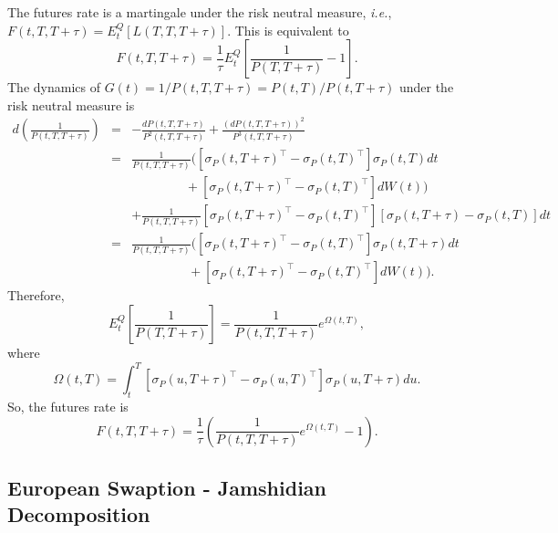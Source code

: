 \documentclass[12pt]{article}
\begin{document}
    The futures rate is a martingale under the risk neutral measure, {\it i.e.}, $F(t,T,T+\tau)=E_t^Q[L(T,T,T+\tau)]$.
    This is equivalent to
    \begin{equation}
      F(t,T,T+\tau)=\frac{1}{\tau}E_t^Q\left[\frac{1}{P(T,T+\tau)}-1\right].
    \end{equation}
    The dynamics of $G(t)=1/P(t,T,T+\tau)=P(t,T)/P(t,T+\tau)$ under the risk neutral measure is
    \begin{eqnarray}
      d\left(\frac{1}{P(t,T,T+\tau)}\right)&=&-\frac{dP(t,T,T+\tau)}{P^2(t,T,T+\tau)}+\frac{\left(dP(t,T,T+\tau)\right)^2}{P^3(t,T,T+\tau)}\nonumber\\
                &=&\frac{1}{P(t,T,T+\tau)}\Big(\left[\sigma_P(t,T+\tau)^{\top}-\sigma_P(t,T)^{\top}\right]\sigma_P(t,T)dt\nonumber\\
                && \ \ \ \ \ \ \ \ \ \ \ \ \ \ \  \ \ \ \ +\left[\sigma_P(t,T+\tau)^{\top}-\sigma_P(t,T)^{\top}\right]dW(t)\Big)\nonumber\\
                && + \frac{1}{P(t,T,T+\tau)}\left[\sigma_P(t,T+\tau)^{\top}-\sigma_P(t,T)^{\top}\right]\left[\sigma_P(t,T+\tau)-\sigma_P(t,T)\right]dt\nonumber\\
                &=&\frac{1}{P(t,T,T+\tau)}\Big(\left[\sigma_P(t,T+\tau)^{\top}-\sigma_P(t,T)^{\top}\right]\sigma_P(t,T+\tau)dt\nonumber\\
                && \ \ \ \ \ \ \ \ \ \ \ \ \ \ \ \ \ \ \ \ +\left[\sigma_P(t,T+\tau)^{\top}-\sigma_P(t,T)^{\top}\right]dW(t)\Big).
    \end{eqnarray}
    Therefore,
    \begin{equation}
      E_t^Q\left[\frac{1}{P(T,T+\tau)}\right]=\frac{1}{P(t,T,T+\tau)}e^{\Omega(t,T)},
    \end{equation}
    where
    \begin{equation}
      \Omega(t,T)=\int_t^T\left[\sigma_P(u,T+\tau)^{\top}-\sigma_P(u,T)^{\top}\right]\sigma_P(u,T+\tau)du.
    \end{equation}
    So, the futures rate is
    \begin{equation}
      F(t,T,T+\tau)=\frac{1}{\tau}\left(\frac{1}{P(t,T,T+\tau)}e^{\Omega(t,T)}-1\right).
    \end{equation}

  \subsection{European Swaption - Jamshidian Decomposition}
\end{document}
